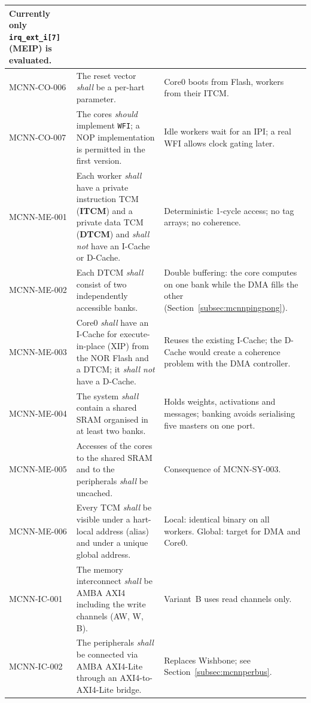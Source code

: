 \begin{longtable}{|p{} |p{} |p{}|}
    Currently only \texttt{irq\_ext\_i[7]} (MEIP) is evaluated. \\
  \hline
  MCNN-CO-006 &
    The reset vector \textit{shall} be a per-hart parameter. &
    Core0 boots from Flash, workers from their ITCM. \\
  \hline
  MCNN-CO-007 &
    The cores \textit{should} implement \texttt{WFI}; a NOP implementation
    is permitted in the first version. &
    Idle workers wait for an IPI; a real WFI allows clock gating later. \\
  \hline
  MCNN-ME-001 &
    Each worker \textit{shall} have a private instruction TCM
    (\textbf{ITCM}) and a private data TCM (\textbf{DTCM}) and
    \textit{shall not} have an I-Cache or D-Cache. &
    Deterministic 1-cycle access; no tag arrays; no coherence. \\
  \hline
  MCNN-ME-002 &
    Each DTCM \textit{shall} consist of two independently accessible banks. &
    Double buffering: the core computes on one bank while the DMA fills the
    other (Section~\ref{subsec:mcnnpingpong}). \\
  \hline
  MCNN-ME-003 &
    Core0 \textit{shall} have an I-Cache for execute-in-place (XIP) from the
    NOR Flash and a DTCM; it \textit{shall not} have a D-Cache. &
    Reuses the existing I-Cache; the D-Cache would create a coherence problem
    with the DMA controller. \\
  \hline
  MCNN-ME-004 &
    The system \textit{shall} contain a shared SRAM organised in at least
    two banks. &
    Holds weights, activations and messages; banking avoids serialising
    five masters on one port. \\
  \hline
  MCNN-ME-005 &
    Accesses of the cores to the shared SRAM and to the peripherals
    \textit{shall} be uncached. &
    Consequence of MCNN-SY-003. \\
  \hline
  MCNN-ME-006 &
    Every TCM \textit{shall} be visible under a hart-local address (alias)
    and under a unique global address. &
    Local: identical binary on all workers.
    Global: target for DMA and Core0. \\
  \hline
  MCNN-IC-001 &
    The memory interconnect \textit{shall} be AMBA AXI4 including the write
    channels (AW, W, B). &
    Variant~B uses read channels only. \\
  \hline
  MCNN-IC-002 &
    The peripherals \textit{shall} be connected via AMBA AXI4-Lite through
    an AXI4-to-AXI4-Lite bridge. &
    Replaces Wishbone; see Section~\ref{subsec:mcnnperbus}. \\

\end{longtable}
